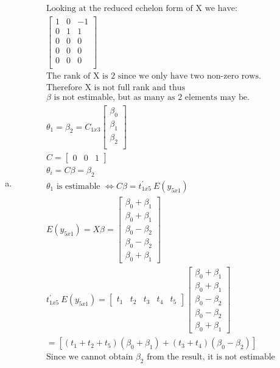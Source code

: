 \documentclass{article}
\newcommand{\B}{\beta}
\begin{document}
\begin{flushleft}
\begin{enumerate}[(a)]
	\item 
\begin{multline*}\\
\text{Looking at the reduced echelon form of X we have:}\\
\left[
\begin{array}{rrr}
1 & 0 & -1 \\ 
0 & 1 & 1 \\ 
0 & 0 & 0 \\ 
0 & 0 & 0 \\ 
0 & 0 & 0 \\ 
\end{array}
\right]\\
\text{The rank of X is 2 since we only have two non-zero rows.}\\
\text{Therefore X is not full rank and thus }\\
 \B \text{ is not estimable, but as many as 2 elements may be.} \\
\theta_1=\B_2=C_{1x3}\left[\begin{array}{r}
\B_0\\
\B_1\\
\B_2\\
\end{array}\right]\\
C=\left[\begin{array}{rrr}
0 & 0 &1
\end{array}\right]\\
\theta_i=C\beta =\B_2\\
\theta_1 \text{ is estimable } \iff C\beta= t^{'}_{1x5} \ E(y_{5x1})\\
E(y_{5x1})=X\beta=\left[\begin{array}{r}
\B_0+\B_1\\
\B_0+\B_1\\
\B_0-\B_2\\
\B_0-\B_2\\
\B_0+\B_1
\end{array}\right]\\
t^{'}_{1x5} \ E(y_{5x1})=\left[\begin{array}{rrrrr}
t_1&t_2&t_3&t_4&t_5
\end{array}\right]
\left[\begin{array}{r}
\B_0+\B_1\\
\B_0+\B_1\\
\B_0-\B_2\\
\B_0-\B_2\\
\B_0+\B_1
\end{array}\right]\\=\left[(t_1+t_2+t_5)(\B_0+\B_1)+(t_3+t_4)(\B_0-\B_2) \right]\\
\text{Since we cannot obtain } \B_2 \text{ from the result, it is not estimable}\\  
\end{multline*}


\end{enumerate}
\end{flushleft}
\end{document}
